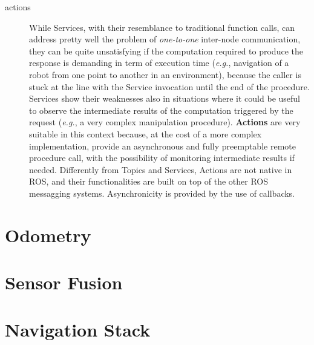 \begin{description}
\item[actions] While Services, with their resemblance to traditional function calls, can address pretty well the problem of \textit{one-to-one} inter-node communication, they can be quite unsatisfying if the computation required to produce the response is demanding in term of execution time (\textit{e.g.}, navigation of a robot from one point to another in an environment), because the caller is stuck at the line with the Service invocation until the end of the procedure. Services show their weaknesses also in situations where it could be useful to observe the intermediate results of the computation triggered by the request (\textit{e.g.}, a very complex manipulation procedure). \textbf{Actions} are very suitable in this context because, at the cost of a more complex implementation, provide an asynchronous and fully preemptable remote procedure call, with the possibility of monitoring intermediate results if needed. Differently from Topics and Services, Actions are not native in \ac{ROS}, and their functionalities are built on top of the other \ac{ROS} messagging systems. Asynchronicity is provided by the use of callbacks.

\end{description}
\section{Odometry}\label{sec:odometry}

\section{Sensor Fusion}\label{sec:sensorFusion}

\section{Navigation Stack}\label{sec:navigationStack}